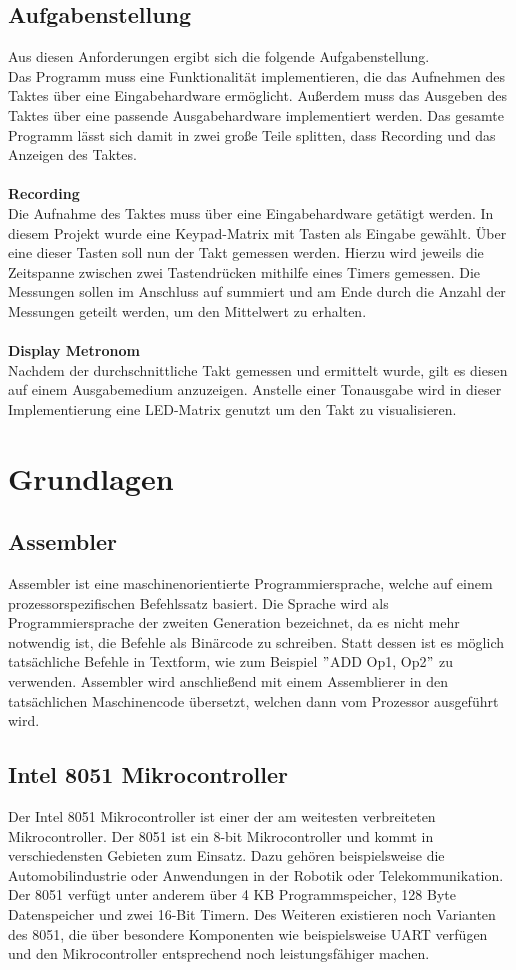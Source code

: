 \documentclass[a4paper, 12pt]{scrartcl}
\begin{document}
\begin{onehalfspace}
\subsection{Aufgabenstellung}
Aus diesen Anforderungen ergibt sich die folgende Aufgabenstellung.
\\
Das Programm muss eine Funktionalität implementieren, die das Aufnehmen des Taktes über eine Eingabehardware ermöglicht. Außerdem muss das Ausgeben des Taktes über eine passende Ausgabehardware implementiert werden.
Das gesamte Programm lässt sich damit in zwei große Teile splitten, dass Recording und das Anzeigen des Taktes.
\\
\\
\textbf{Recording}
\\
Die Aufnahme des Taktes muss über eine Eingabehardware getätigt werden. In diesem Projekt wurde eine Keypad-Matrix mit Tasten als Eingabe gewählt. Über eine dieser Tasten soll nun der Takt gemessen werden. Hierzu wird jeweils die Zeitspanne zwischen zwei Tastendrücken mithilfe eines Timers gemessen. Die Messungen sollen im Anschluss auf summiert und am Ende durch die Anzahl der Messungen geteilt werden, um den Mittelwert zu erhalten.
\\
\\
\textbf{Display Metronom}
\\
Nachdem der durchschnittliche Takt gemessen und ermittelt wurde, gilt es diesen auf einem Ausgabemedium anzuzeigen. Anstelle einer Tonausgabe wird in dieser Implementierung eine LED-Matrix genutzt um den Takt zu visualisieren.
\newpage
\section{Grundlagen}
\subsection{Assembler}
Assembler ist eine maschinenorientierte Programmiersprache, welche auf einem prozessorspezifischen Befehlssatz basiert. Die Sprache wird als Programmiersprache der zweiten Generation bezeichnet, da es nicht mehr notwendig ist, die Befehle als Binärcode zu schreiben. Statt dessen ist es möglich tatsächliche Befehle in Textform, wie zum Beispiel $"$ADD Op1, Op2$"$ zu verwenden. Assembler wird anschließend mit einem Assemblierer in den tatsächlichen Maschinencode übersetzt, welchen dann vom Prozessor ausgeführt wird.

\subsection{Intel 8051 Mikrocontroller}
Der Intel 8051 Mikrocontroller ist einer der am weitesten verbreiteten Mikrocontroller. Der 8051 ist ein 8-bit Mikrocontroller und kommt in verschiedensten Gebieten zum Einsatz. Dazu gehören beispielsweise die Automobilindustrie oder Anwendungen in der Robotik oder Telekommunikation. Der 8051 verfügt unter anderem über 4 KB Programmspeicher, 128 Byte Datenspeicher und zwei 16-Bit Timern. Des Weiteren existieren noch Varianten des 8051, die über besondere Komponenten wie beispielsweise UART verfügen und den Mikrocontroller entsprechend noch leistungsfähiger machen.


\end{onehalfspace}
\end{document}
